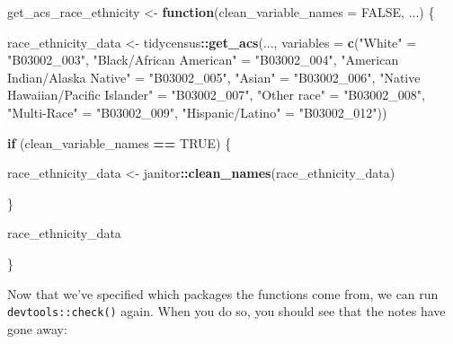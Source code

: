 \documentclass[
]{book}
\newenvironment{Shaded}{\begin{snugshade}}{\end{snugshade}}
\newcommand{\AttributeTok}[1]{\textcolor[rgb]{0.13,0.29,0.53}{#1}}
\newcommand{\ConstantTok}[1]{\textcolor[rgb]{0.56,0.35,0.01}{#1}}
\newcommand{\ControlFlowTok}[1]{\textcolor[rgb]{0.13,0.29,0.53}{\textbf{#1}}}
\newcommand{\FunctionTok}[1]{\textcolor[rgb]{0.13,0.29,0.53}{\textbf{#1}}}
\newcommand{\NormalTok}[1]{#1}
\newcommand{\OtherTok}[1]{\textcolor[rgb]{0.56,0.35,0.01}{#1}}
\newcommand{\SpecialCharTok}[1]{\textcolor[rgb]{0.81,0.36,0.00}{\textbf{#1}}}
\newcommand{\StringTok}[1]{\textcolor[rgb]{0.31,0.60,0.02}{#1}}
\begin{document}
\begin{Shaded}
\begin{Highlighting}[]
\NormalTok{get\_acs\_race\_ethnicity }\OtherTok{\textless{}{-}} \ControlFlowTok{function}\NormalTok{(}\AttributeTok{clean\_variable\_names =} \ConstantTok{FALSE}\NormalTok{,}
\NormalTok{                                   ...) \{}
  
\NormalTok{  race\_ethnicity\_data }\OtherTok{\textless{}{-}}\NormalTok{ tidycensus}\SpecialCharTok{::}\FunctionTok{get\_acs}\NormalTok{(...,}
                                             \AttributeTok{variables =} \FunctionTok{c}\NormalTok{(}\StringTok{"White"} \OtherTok{=} \StringTok{"B03002\_003"}\NormalTok{,}
                                                           \StringTok{"Black/African American"} \OtherTok{=} \StringTok{"B03002\_004"}\NormalTok{,}
                                                           \StringTok{"American Indian/Alaska Native"} \OtherTok{=} \StringTok{"B03002\_005"}\NormalTok{,}
                                                           \StringTok{"Asian"} \OtherTok{=} \StringTok{"B03002\_006"}\NormalTok{,}
                                                           \StringTok{"Native Hawaiian/Pacific Islander"} \OtherTok{=} \StringTok{"B03002\_007"}\NormalTok{,}
                                                           \StringTok{"Other race"} \OtherTok{=} \StringTok{"B03002\_008"}\NormalTok{,}
                                                           \StringTok{"Multi{-}Race"} \OtherTok{=} \StringTok{"B03002\_009"}\NormalTok{,}
                                                           \StringTok{"Hispanic/Latino"} \OtherTok{=} \StringTok{"B03002\_012"}\NormalTok{)) }
  
  \ControlFlowTok{if}\NormalTok{ (clean\_variable\_names }\SpecialCharTok{==} \ConstantTok{TRUE}\NormalTok{) \{}
    
\NormalTok{    race\_ethnicity\_data }\OtherTok{\textless{}{-}}\NormalTok{ janitor}\SpecialCharTok{::}\FunctionTok{clean\_names}\NormalTok{(race\_ethnicity\_data)}
    
\NormalTok{  \}}
  
\NormalTok{  race\_ethnicity\_data}
  
\NormalTok{\}}
\end{Highlighting}
\end{Shaded}

Now that we've specified which packages the functions come from, we can run \texttt{devtools::check()} again. When you do so, you should see that the notes have gone away:
\end{document}
